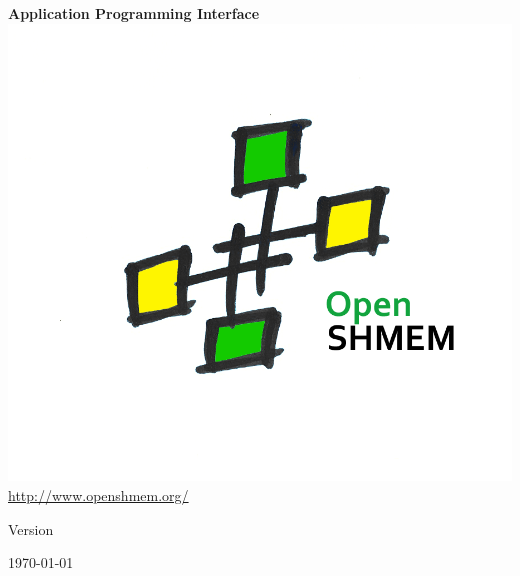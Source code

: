 \thispagestyle{empty}
\begin{center}
\textbf{\Huge \openshmem}
\par
\end{center}

\begin{center}
\textbf{\LARGE Application Programming Interface}\\
\includegraphics[scale=0.65]{OpenSHMEM_Pound}\\
\url{http://www.openshmem.org/}
\par
\end{center}

\begin{center}
Version \insertDocVersion
\par
\end{center}

\vspace{0.5in}
\begin{center}
\today
\end{center}

\vspace{0.5in}



